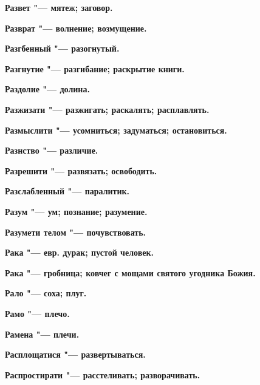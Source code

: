\begin{mymulticols}{2}
\bfseries Развет\normalfont{} "--- мятеж; заговор. 




\bfseries Разврат\normalfont{} "--- волнение; возмущение. 




\bfseries Разгбенный\normalfont{} "--- разогнутый. 




\bfseries Разгнутие\normalfont{} "--- разгибание; раскрытие книги. 




\bfseries Раздолие\normalfont{} "--- долина. 




\bfseries Разжизати\normalfont{} "--- разжигать; раскалять; расплавлять. 




\bfseries Размыслити\normalfont{} "--- усомниться; задуматься; остановиться. 




\bfseries Разнство\normalfont{} "--- различие. 




\bfseries Разрешити\normalfont{} "--- развязать; освободить. 




\bfseries Разслабленный\normalfont{} "--- паралитик. 




\bfseries Разум\normalfont{} "--- ум; познание; разумение. 




\bfseries Разумети телом\normalfont{} "--- почувствовать. 




\bfseries Рака\normalfont{} "--- евр. дурак; пустой человек. 




\bfseries Рака\normalfont{} "--- гробница; ковчег с мощами святого угодника Божия. 




\bfseries Рало\normalfont{} "--- соха; плуг. 




\bfseries Рамо\normalfont{} "--- плечо. 




\bfseries Рамена\normalfont{} "--- плечи. 




\bfseries Расплощатися\normalfont{} "--- развертываться. 




\bfseries Распростирати\normalfont{} "--- расстеливать; разворачивать. 





\end{mymulticols}
